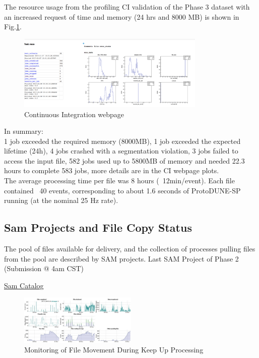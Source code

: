 \documentclass[pdftex,12pt,letter]{article}
\begin{document}
\begin{itemize}
The resource usage from the profiling CI validation of the Phase 3 dataset with an increased request of time and memory (24 hrs and 8000 MB) is shown in Fig.\ref{fig:ciphase3}.

\begin{figure}[tbh]
  \centering
  \includegraphics[width=0.8\textwidth]{./ReportImages/DC1_Phase3_CI.png}
  \caption{Continuous Integration webpage}
  \label{fig:ciphase3}
\end{figure}

\end{itemize}

In summary: \\
1 job exceeded the required memory (8000MB),
1 job exceeded the expected lifetime (24h),
4 jobs crashed with a segmentation violation,
3 jobs failed to access the input file,
582 jobs used up to  5800MB of memory and needed  22.3 hours  to complete 583 jobs, more details are in the CI webpage plots.\\
The average processing time per file was 8 hours (~12min/event).  Each file contained ~40 events, corresponding to about 1.6 seconds of ProtoDUNE-SP running (at the nominal 25 Hz rate).


\pagebreak

\subsection {Sam Projects and File Copy Status}

The pool of files available for delivery, and the collection of processes pulling files from the pool are described by  SAM projects.
Last SAM Project of Phase 2 (Submission @ 4am CST)

\href{http://samweb.fnal.gov:8480/station_monitor/dune/stations/dune/projects/dunepro-null_lar.sh_20171110_040116_3425472}{Sam Catalog}



\begin{figure}[tbh]
  \centering
  \includegraphics[width=0.5\textwidth]{./ReportImages/SamProjectsKeepupoutput.jpg}
  \caption{Monitoring of File Movement During Keep Up Processing}
  \label{fig:FTSKeepUPProcessing}
\end{figure}
\end{document}
